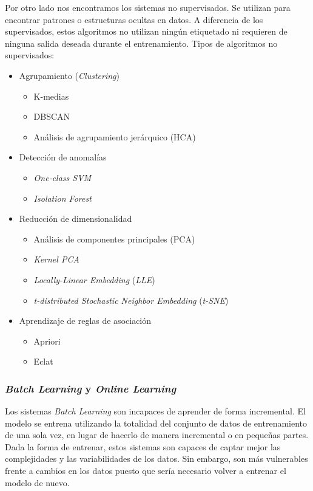 \documentclass[12pt,a4paper]{article}
\begin{document}
Por otro lado nos encontramos los sistemas no supervisados. Se utilizan para encontrar patrones o estructuras ocultas en datos. A diferencia de los supervisados, estos algoritmos no utilizan ningún etiquetado ni requieren de ninguna salida deseada durante el entrenamiento. Tipos de algoritmos no supervisados:
\begin{itemize}
	\item Agrupamiento (\textit{Clustering})
	\begin{itemize}
		\item K-medias
		\item DBSCAN
		\item Análisis de agrupamiento jerárquico (HCA)	
	\end{itemize}
	\item Detección de anomalías
	\begin{itemize}
		\item \textit{One-class SVM}
		\item \textit{Isolation Forest}	
	\end{itemize}
	\item Reducción de dimensionalidad
	\begin{itemize}
		\item Análisis de componentes principales (PCA)
		\item \textit{Kernel PCA}	
		\item \textit{Locally-Linear Embedding} (\textit{LLE})
		\item \textit{t-distributed Stochastic Neighbor Embedding} (\textit{t-SNE})
	\end{itemize}
	\item Aprendizaje de reglas de asociación
	\begin{itemize}
		\item Apriori
		\item Eclat	
	\end{itemize}	
\end{itemize}

\subsubsection{\textit{Batch Learning} y \textit{Online Learning}}
Los sistemas \textit{Batch Learning} son incapaces de aprender de forma incremental. El modelo se entrena utilizando la totalidad del conjunto de datos de entrenamiento de una sola vez, en lugar de hacerlo de manera incremental o en pequeñas partes. Dada la forma de entrenar, estos sistemas son capaces de captar mejor las complejidades y las variabilidades de los datos. Sin embargo, son más vulnerables frente a cambios en los datos puesto que sería necesario volver a entrenar el modelo de nuevo.
\end{document}
